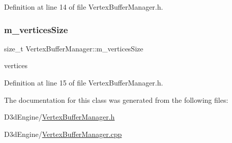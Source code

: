 Definition at line 14 of file Vertex\+Buffer\+Manager.\+h.

\mbox{\label{class_vertex_buffer_manager_a9d499437ec6b54fd97f27a106b0d424a}} 
\subsubsection{\texorpdfstring{m\+\_\+vertices\+Size}{m\_verticesSize}}
{\footnotesize\ttfamily size\+\_\+t Vertex\+Buffer\+Manager\+::m\+\_\+vertices\+Size\hspace{0.3cm}{\ttfamily [private]}}



vertices 



Definition at line 15 of file Vertex\+Buffer\+Manager.\+h.



The documentation for this class was generated from the following files\+:\begin{DoxyCompactItemize}
\item 
D3d\+Engine/\mbox{\hyperlink{_vertex_buffer_manager_8h}{Vertex\+Buffer\+Manager.\+h}}\item 
D3d\+Engine/\mbox{\hyperlink{_vertex_buffer_manager_8cpp}{Vertex\+Buffer\+Manager.\+cpp}}\end{DoxyCompactItemize}
